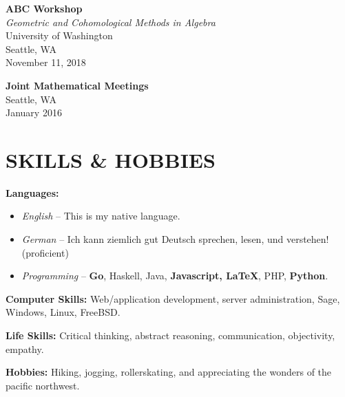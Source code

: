 \documentclass[margin]{res} %
\begin{document}
\begin{resume}
{\bf ABC Workshop}\\
{\sl Geometric and Cohomological Methods in Algebra}\\
University of Washington\\
Seattle, WA\\
November 11, 2018

{\bf Joint Mathematical Meetings}\\
Seattle, WA\\
January 2016


\section{SKILLS \& HOBBIES} 

{\bf Languages:}
\begin{itemize} \itemsep -2pt
	\item {\sl English} -- This is my native language.
	\item {\sl German} -- Ich kann ziemlich gut Deutsch sprechen, lesen, und verstehen! (proficient)
	\item {\sl Programming} -- {\bf Go}, Haskell, Java, {\bf Javascript, \LaTeX}, PHP, {\bf Python}.
\end{itemize}
{\bf Computer Skills:} Web/application development, server administration, Sage, Windows, Linux, FreeBSD.

{\bf Life Skills:} Critical thinking, abstract reasoning, communication, objectivity, empathy.

{\bf Hobbies:} Hiking, jogging, rollerskating, and appreciating the wonders of the pacific northwest.



\end{resume}
\end{document}
